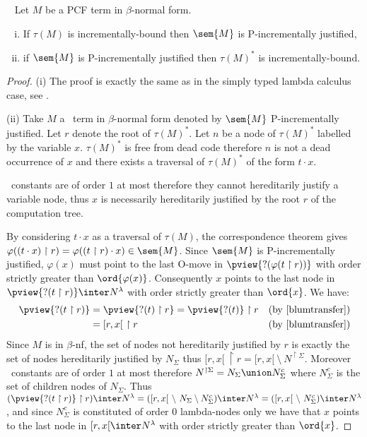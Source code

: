 \begin{proposition} \
\label{prop:incrbound_imp_incrjustified_pcf} Let $M$ be a PCF term in $\beta$-normal form.
\begin{enumerate}[(i)]
\item  If $\tau(M)$ is incrementally-bound then $\sem{M}$ is P-incrementally justified,
\item  if $\sem{M}$ is P-incrementally justified
then $\tau(M)^*$ is incrementally-bound.
\end{enumerate}
\end{proposition}
\begin{proof}
(i) The proof is exactly the same as in the simply typed lambda calculus case,
see \cite[Proposition 4.1.5(i)]{blumtransfer}.

\noindent (ii)
Take $M$ a \pcf\ term in $\beta$-normal form denoted by $\sem{M}$ P-incrementally justified. Let $r$ denote the root of $\tau(M)^*$.
Let $n$ be a node of $\tau(M)^*$ labelled by the variable $x$.
$\tau(M)^*$ is free from dead code therefore $n$ is not a dead occurrence of $x$ and there exists a traversal of $\tau(M)^*$ of the form $t \cdot x$.

\pcf\ constants are of order $1$ at most therefore they cannot hereditarily justify a variable node, thus $x$ is necessarily hereditarily justified by the root $r$ of the computation tree.


By considering $t\cdot x$ as a traversal of $\tau(M)$,  the correspondence theorem gives $\varphi((t \cdot x) \upharpoonright r) = \varphi((t \upharpoonright r) \cdot x) \in \sem{M}$. Since $\sem{M}$ is P-incrementally justified, $\varphi(x)$ must point to the last O-move in $\pview{?(\varphi(t \upharpoonright
r))}$ with order strictly greater than $\ord{\varphi(x)}$.
Consequently $x$ points to the last node in $\pview{?(t
\upharpoonright r)} \inter N^{\lambda}$ with order strictly greater than $\ord{x}$. We have:
\begin{align*}
\pview{?(t \upharpoonright r)} &= \pview{?(t) \upharpoonright r} = \pview{?(t)} \upharpoonright r & (\mbox{by \cite[lemma 3.1.23]{blumtransfer}}) \\
& = [r,x[ \ \upharpoonright r & (\mbox{by \cite[proposition 3.1.20]{blumtransfer}})
\end{align*}
Since $M$ is in $\beta$-nf, the set of nodes not hereditarily justified by $r$ is exactly the set of nodes hereditarily justified by $N_{\Sigma}$ thus
$[r,x[ \ \upharpoonright r = [r,x[\ \setminus\  N^{\upharpoonright \Sigma}$.
Moreover \pcf\ constants are of order $1$ at most therefore $N^{\upharpoonright \Sigma} = N_{\Sigma} \union N^c_{\Sigma}$
where $N^c_{\Sigma}$ is the set of children nodes of $N_{\Sigma}$.
Thus $(\pview{?(t \upharpoonright r)}\upharpoonright r) \inter N^{\lambda} =
([r,x[\ \setminus\  N_{\Sigma} \setminus N^c_{\Sigma} ) \inter N^{\lambda} =
([r,x[\ \setminus\  N^c_{\Sigma} )  \inter N^{\lambda}$, and
since $N^c_{\Sigma}$ is constituted of order $0$ lambda-nodes only we have that
$x$ points to the last node in $[r,x[ \inter N^{\lambda}$ with order strictly greater than $\ord{x}$.


\end{proof}
